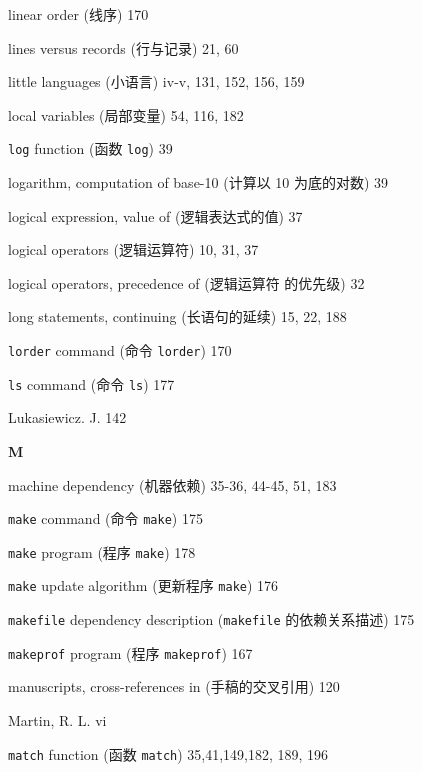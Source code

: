 \begin{multicols}{2}
\hangindent=2pc  linear order (线序) 170

\hangindent=2pc  lines versus records (行与记录) 21, 60

\hangindent=2pc  little languages (小语言) iv-v, 131, 152, 156, 159

\hangindent=2pc  local variables (局部变量) 54, 116, 182

\hangindent=2pc  \verb'log' function (函数 \verb'log') 39

\hangindent=2pc  logarithm, computation of base-10 (计算以 10
为底的对数) 39

\hangindent=2pc  logical expression, value of (逻辑表达式的值) 37

\hangindent=2pc  logical operators (逻辑运算符) 10, 31, 37

\hangindent=2pc  logical operators, precedence of (逻辑运算符
的优先级) 32

\hangindent=2pc  long statements, continuing (长语句的延续)
15, 22, 188

\hangindent=2pc  \verb'lorder' command (命令 \verb'lorder') 170

\hangindent=2pc  \verb'ls' command (命令 \verb'ls') 177

\hangindent=2pc  Lukasiewicz. J. 142

\medskip\textbf{\large{M}}

\hangindent=2pc  machine dependency (机器依赖) 35-36, 44-45, 51, 183

\hangindent=2pc  \verb'make' command (命令 \verb'make') 175

\hangindent=2pc  \verb'make' program (程序 \verb'make') 178

\hangindent=2pc  \verb'make' update algorithm (更新程序
\verb'make') 176

\hangindent=2pc  \verb'makefile' dependency description
(\verb'makefile' 的依赖关系描述) 175

\hangindent=2pc  \verb'makeprof' program (程序 \verb'makeprof') 167

\hangindent=2pc  manuscripts, cross-references in
(手稿的交叉引用) 120

\hangindent=2pc  Martin, R. L. vi

\hangindent=2pc  \verb'match' function (函数 \verb'match')
35,41,149,182, 189, 196


\end{multicols}

